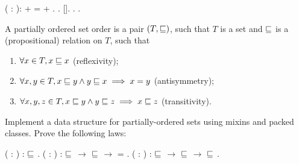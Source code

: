 \begin{coqdoccode}
\coqdocemptyline
\coqdocnoindent
{}  ( : ):  +  =  + .\coqdoceol
\coqdocnoindent
{}.  []. .\coqdoceol
\coqdocemptyline
\coqdocnoindent
{} .\coqdoceol
\coqdocemptyline
\end{coqdoccode}
\begin{exercise}




A partially ordered set order is a pair $(T, \sqsubseteq)$, such that $T$ is
a set and $\sqsubseteq$ is a (propositional) relation on $T$, such that



\begin{enumerate}
\item $\forall x \in T, x \sqsubseteq x$ (reflexivity);

\item $\forall x, y \in T, x \sqsubseteq y \wedge y \sqsubseteq x \implies x = y$ (antisymmetry);

\item $\forall x, y, z \in T, x \sqsubseteq y \wedge y \sqsubseteq z \implies x \sqsubseteq z$ (transitivity).
\end{enumerate}



\noindent
Implement a data structure for partially-ordered sets using mixins and
packed classes. Prove the following laws:


\coqdoceol
\coqdocemptyline
\coqdocnoindent
{}  ( : ) :  $\sqsubseteq$ .\coqdoceol
\coqdocnoindent
{}  (  : ) :  $\sqsubseteq$  \ensuremath{\rightarrow}  $\sqsubseteq$  \ensuremath{\rightarrow}  = .\coqdoceol
\coqdocnoindent
{}  (   : ) :  $\sqsubseteq$  \ensuremath{\rightarrow}  $\sqsubseteq$  \ensuremath{\rightarrow}  $\sqsubseteq$ .

\coqdocemptyline


\end{exercise}


